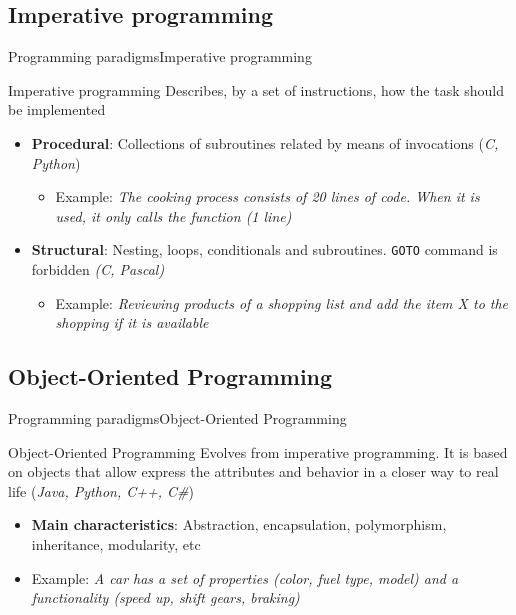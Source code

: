 \documentclass[10pt,compress]{beamer} %
\begin{document}
\subsection{Imperative programming}

\begin{frame}{Programming paradigms}{Imperative programming}
	\begin{block}{Imperative programming}
		Describes, by a set of instructions, \alert{how} the task should be implemented  
  	\end{block}
  	\begin{itemize}
  		\item \textbf{Procedural}: Collections of subroutines related by means of invocations (\textit{C, Python})
  		\begin{itemize}
  			\item Example: \textit{The cooking process consists of 20 lines of code. When it is used, it only calls the function (1 line)} 
  		\end{itemize}
  		\item \textbf{Structural}: Nesting, loops, conditionals and subroutines. \texttt{GOTO} command is forbidden 				 \textit{(C, Pascal)}
  		\begin{itemize}
  			\item Example: \textit{Reviewing products of a shopping list and add the item X to the shopping if it is available} 
  		\end{itemize}
  	\end{itemize}
\end{frame}

\subsection{Object-Oriented Programming}

\begin{frame}{Programming paradigms}{Object-Oriented Programming}
	\begin{block}{Object-Oriented Programming}
		Evolves from imperative programming. It is based on \alert{objects} that allow express the \alert{attributes} and \alert{behavior} in a closer way to real life (\textit{Java, Python, C++, C\#})
  	\end{block}
  	\begin{itemize}
  		\item \textbf{Main characteristics}: Abstraction, encapsulation, polymorphism, inheritance, modularity, etc
		\item Example: \textit{A car has a set of properties (color, fuel type, model) and a functionality (speed up, shift gears, braking)} 
  	\end{itemize}
\end{frame}
\end{document}
